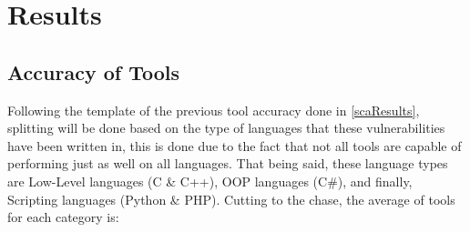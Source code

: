 \vspace{-3mm}

\section{Results} \label{VSCAResults}

\subsection{Accuracy of Tools}

Following the template of the previous tool accuracy done in \ref{scaResults}, splitting will be done based on the type of languages that these vulnerabilities have been written in, this is done due to the fact that not all tools are capable of performing just as well on all languages. That being said, these language types are Low-Level languages (C \& C++), OOP languages (C\#), and finally, Scripting languages (Python \& PHP). Cutting to the chase, the average of tools for each category is:

